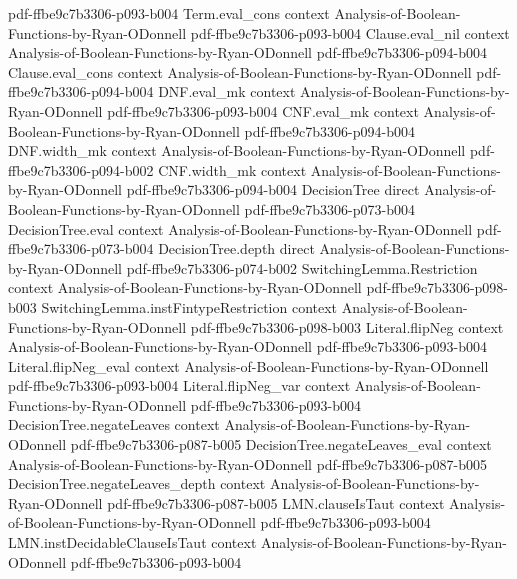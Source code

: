 \begin{theorem}
  {pdf-ffbe9c7b3306-p093-b004}
\proofstep
  {Term.eval_cons}
  {context}
  {Analysis-of-Boolean-Functions-by-Ryan-ODonnell}
  {pdf-ffbe9c7b3306-p093-b004}
\proofstep
  {Clause.eval_nil}
  {context}
  {Analysis-of-Boolean-Functions-by-Ryan-ODonnell}
  {pdf-ffbe9c7b3306-p094-b004}
\proofstep
  {Clause.eval_cons}
  {context}
  {Analysis-of-Boolean-Functions-by-Ryan-ODonnell}
  {pdf-ffbe9c7b3306-p094-b004}
\proofstep
  {DNF.eval_mk}
  {context}
  {Analysis-of-Boolean-Functions-by-Ryan-ODonnell}
  {pdf-ffbe9c7b3306-p093-b004}
\proofstep
  {CNF.eval_mk}
  {context}
  {Analysis-of-Boolean-Functions-by-Ryan-ODonnell}
  {pdf-ffbe9c7b3306-p094-b004}
\proofstep
  {DNF.width_mk}
  {context}
  {Analysis-of-Boolean-Functions-by-Ryan-ODonnell}
  {pdf-ffbe9c7b3306-p094-b002}
\proofstep
  {CNF.width_mk}
  {context}
  {Analysis-of-Boolean-Functions-by-Ryan-ODonnell}
  {pdf-ffbe9c7b3306-p094-b004}
\proofstep
  {DecisionTree}
  {direct}
  {Analysis-of-Boolean-Functions-by-Ryan-ODonnell}
  {pdf-ffbe9c7b3306-p073-b004}
\proofstep
  {DecisionTree.eval}
  {context}
  {Analysis-of-Boolean-Functions-by-Ryan-ODonnell}
  {pdf-ffbe9c7b3306-p073-b004}
\proofstep
  {DecisionTree.depth}
  {direct}
  {Analysis-of-Boolean-Functions-by-Ryan-ODonnell}
  {pdf-ffbe9c7b3306-p074-b002}
\proofstep
  {SwitchingLemma.Restriction}
  {context}
  {Analysis-of-Boolean-Functions-by-Ryan-ODonnell}
  {pdf-ffbe9c7b3306-p098-b003}
\proofstep
  {SwitchingLemma.instFintypeRestriction}
  {context}
  {Analysis-of-Boolean-Functions-by-Ryan-ODonnell}
  {pdf-ffbe9c7b3306-p098-b003}
\proofstep
  {Literal.flipNeg}
  {context}
  {Analysis-of-Boolean-Functions-by-Ryan-ODonnell}
  {pdf-ffbe9c7b3306-p093-b004}
\proofstep
  {Literal.flipNeg_eval}
  {context}
  {Analysis-of-Boolean-Functions-by-Ryan-ODonnell}
  {pdf-ffbe9c7b3306-p093-b004}
\proofstep
  {Literal.flipNeg_var}
  {context}
  {Analysis-of-Boolean-Functions-by-Ryan-ODonnell}
  {pdf-ffbe9c7b3306-p093-b004}
\proofstep
  {DecisionTree.negateLeaves}
  {context}
  {Analysis-of-Boolean-Functions-by-Ryan-ODonnell}
  {pdf-ffbe9c7b3306-p087-b005}
\proofstep
  {DecisionTree.negateLeaves_eval}
  {context}
  {Analysis-of-Boolean-Functions-by-Ryan-ODonnell}
  {pdf-ffbe9c7b3306-p087-b005}
\proofstep
  {DecisionTree.negateLeaves_depth}
  {context}
  {Analysis-of-Boolean-Functions-by-Ryan-ODonnell}
  {pdf-ffbe9c7b3306-p087-b005}
\proofstep
  {LMN.clauseIsTaut}
  {context}
  {Analysis-of-Boolean-Functions-by-Ryan-ODonnell}
  {pdf-ffbe9c7b3306-p093-b004}
\proofstep
  {LMN.instDecidableClauseIsTaut}
  {context}
  {Analysis-of-Boolean-Functions-by-Ryan-ODonnell}
  {pdf-ffbe9c7b3306-p093-b004}

\end{theorem}
